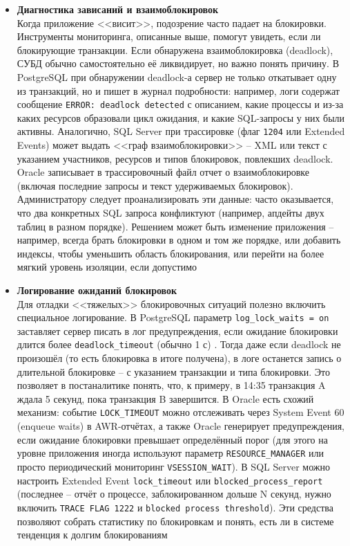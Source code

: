 \begin{itemize}
    \item \textbf{Диагностика зависаний и взаимоблокировок} ~\\
    Когда приложение <<висит>>, подозрение часто падает на блокировки. Инструменты мониторинга, описанные выше, помогут увидеть, если ли блокирующие транзакции. Если обнаружена взаимоблокировка (deadlock), СУБД обычно самостоятельно её ликвидирует, но важно понять причину. В PostgreSQL при обнаружении deadlock-а сервер не только откатывает одну из транзакций, но и пишет в журнал подробности: например, логи содержат сообщение \texttt{ERROR: deadlock detected} с описанием, какие процессы и из-за каких ресурсов образовали цикл ожидания, и какие SQL-запросы у них были активны. Аналогично, SQL Server при трассировке (флаг \texttt{1204} или Extended Events) может выдать <<граф взаимоблокировки>> – XML или текст с указанием участников, ресурсов и типов блокировок, повлекших deadlock. Oracle записывает в трассировочный файл отчет о взаимоблокировке (включая последние запросы и текст удерживаемых блокировок). Администратору следует проанализировать эти данные: часто оказывается, что два конкретных SQL запроса конфликтуют (например, апдейты двух таблиц в разном порядке). Решением может быть изменение приложения – например, всегда брать блокировки в одном и том же порядке, или добавить индексы, чтобы уменьшить область блокирования, или перейти на более мягкий уровень изоляции, если допустимо
    \item \textbf{Логирование ожиданий блокировок} ~\\
    Для отладки <<тяжелых>> блокировочных ситуаций полезно включить специальное логирование. В PostgreSQL параметр \texttt{log\_lock\_waits = on} заставляет сервер писать в лог предупреждения, если ожидание блокировки длится более \texttt{deadlock\_timeout} (обычно 1 с) \autocite{PostgreSQLdocc19}. Тогда даже если deadlock не произошёл (то есть блокировка в итоге получена), в логе останется запись о длительной блокировке – с указанием транзакции и типа блокировки. Это позволяет в постаналитике понять, что, к примеру, в 14:35 транзакция A ждала 5 секунд, пока транзакция B завершится. В Oracle есть схожий механизм: событие \texttt{LOCK\_TIMEOUT} можно отслеживать через System Event 60 (enqueue waits) в AWR-отчётах, а также Oracle генерирует предупреждения, если ожидание блокировки превышает определённый порог (для этого на уровне приложения иногда используют параметр \texttt{RESOURCE\_MANAGER} или просто периодический мониторинг \texttt{V\textdollar SESSION\_WAIT}). В SQL Server можно настроить Extended Event \texttt{lock\_timeout} или \texttt{blocked\_process\_report} (последнее – отчёт о процессе, заблокированном дольше N секунд, нужно включить \texttt{TRACE FLAG 1222} и \texttt{blocked process threshold}). Эти средства позволяют собрать статистику по блокировкам и понять, есть ли в системе тенденция к долгим блокированиям 

\end{itemize}

